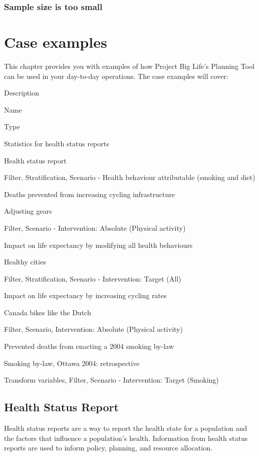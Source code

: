 \documentclass[]{book}
\begin{document}
\subsection{Sample size is too small}\label{sample-size-is-too-small}

\chapter{Case examples}\label{caseexamples}

This chapter provides you with examples of how Project Big Life's
Planning Tool can be used in your day-to-day operations. The case
examples will cover:

Description

Name

Type

Statistics for health status reports

Health status report

Filter, Stratification, Scenario - Health behaviour attributable
(smoking and diet)

Deaths prevented from increasing cycling infrastructure

Adjusting gears

Filter, Scenario - Intervention: Absolute (Physical activity)

Impact on life expectancy by modifying all health behaviours

Healthy cities

Filter, Stratification, Scenario - Intervention: Target (All)

Impact on life expectancy by increasing cycling rates

Canada bikes like the Dutch

Filter, Scenario, Intervention: Absolute (Physical activity)

Prevented deaths from enacting a 2004 smoking by-law

Smoking by-law, Ottawa 2004: retrospective

Transform variables, Filter, Scenario - Intervention: Target (Smoking)

\section{Health Status Report}\label{health-status-report}

Health status reports are a way to report the health state for a
population and the factors that influence a population's health.
Information from health status reports are used to inform policy,
planning, and resource allocation.
\end{document}

